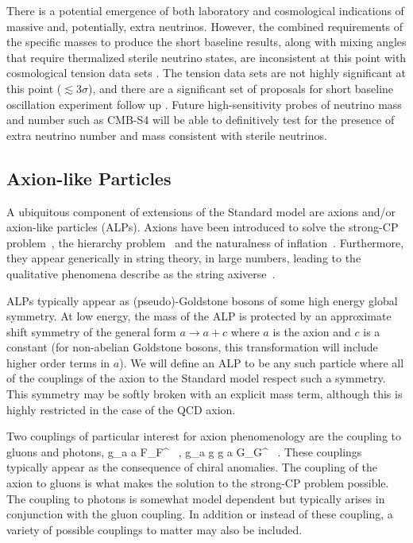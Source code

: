 There is a potential emergence of both laboratory and cosmological
indications of massive and, potentially, extra neutrinos. However, the
combined requirements of the specific masses to produce the short
baseline results, along with mixing angles that require thermalized
sterile neutrino states, are inconsistent at this point with
cosmological tension data sets
\cite{Joudaki:2012uk,Archidiacono:2013xxa}. The tension data sets are
not highly significant at this point ($\lesssim 3\sigma$), and there
are a significant set of proposals for short baseline oscillation
experiment follow up \cite{Abazajian:2012ys}. Future high-sensitivity
probes of neutrino mass and number such as CMB-S4 will be able to
definitively test for the presence of extra neutrino number and mass
consistent with sterile neutrinos.


\subsection{Axion-like Particles}\label{sec:axions}

A ubiquitous component of extensions of the Standard model are axions and/or axion-like particles (ALPs).  Axions have been introduced to solve the strong-CP problem~\cite{Peccei:1977hh}, the hierarchy problem~\cite{Graham:2015cka} and the naturalness of inflation~\cite{Freese:1990rb}.  Furthermore, they appear generically in string theory, in large numbers, leading to the qualitative phenomena describe as the string axiverse~\cite{Arvanitaki:2009fg}.

ALPs typically appear as (pseudo)-Goldstone bosons of some high energy global symmetry.  At low energy, the mass of the ALP is protected by an approximate shift symmetry of the general form $a \to a + c$ where $a$ is the axion and $c$ is a constant (for non-abelian Goldstone bosons, this transformation will include higher order terms in $a$).  We will define an ALP to be any such particle where all of the couplings of the axion to the Standard model respect such a symmetry.  This symmetry may be softly broken with an explicit mass term, although this is highly restricted in the case of the QCD axion.

Two couplings of particular interest for axion phenomenology are the coupling to gluons and photons, 
\beq
{} g_{a \gamma \gamma} a \tilde F_{\mu \nu}F^{\mu\nu} \ , \qquad \qquad {} g_{a g g} a \tilde G_{\mu \nu}G^{\mu\nu}  \ .
\eeq
These couplings typically appear as the consequence of chiral anomalies.  The coupling of the axion to gluons is what makes the solution to the strong-CP problem possible.  The coupling to photons is somewhat model dependent but typically arises in conjunction with the gluon coupling.  In addition or instead of these coupling, a variety of possible couplings to matter may also be included.


